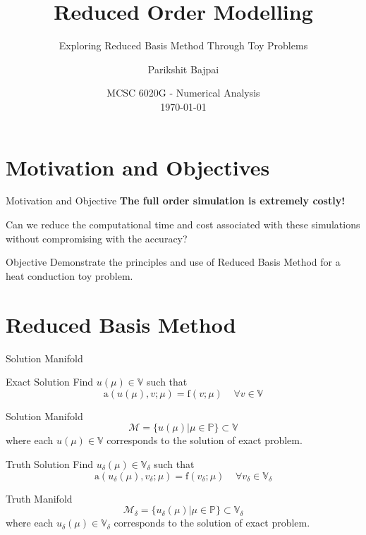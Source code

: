 \documentclass[9pt]{beamer}
\title{Reduced Order Modelling}
\subtitle{Exploring Reduced Basis Method Through Toy Problems}
\author{Parikshit Bajpai}
\date{MCSC 6020G - Numerical Analysis \\ \small{\today}}
\begin{document}
 
\frame{\titlepage}

\frame{\tableofcontents} 

\section{Motivation and Objectives}
\begin{frame}{Motivation and Objective}
\centering
\textbf{The full order simulation is extremely costly!}

Can we reduce the computational time and cost associated with these simulations without compromising with the accuracy?

\vspace{1em}
\begin{alertblock}{Objective}
    \centering Demonstrate the principles and use of Reduced Basis Method for a heat conduction toy problem.
\end{alertblock}
\end{frame}

\section{Reduced Basis Method}
\begin{frame}{Solution Manifold}
    \begin{block}{Exact Solution}
        Find $u(\mu) \in \mathbb{V}$ such that
        $$\mathrm{a}(u(\mu), v; \mu) = \mathrm{f}(v;\mu) \mspace{20mu} \forall v \in \mathbb{V}$$
    \end{block}
    \begin{block}{Solution Manifold}
        $$\mathcal{M} = \{u(\mu)|\mu \in \mathbb{P}\} \subset \mathbb{V}$$
        where each $u(\mu) \in \mathbb{V}$ corresponds to the solution of exact problem.
    \end{block}
    \begin{exampleblock}{Truth Solution}
        Find $u_{\delta}(\mu) \in \mathbb{V}_{\delta}$ such that
        $$\mathrm{a}(u_{\delta}(\mu), v_{\delta}; \mu) = \mathrm{f}(v_{\delta};\mu) \mspace{20mu} \forall v_{\delta} \in \mathbb{V}_{\delta}$$
    \end{exampleblock}
    \begin{exampleblock}{Truth Manifold}
        $$\mathcal{M}_{\delta} = \{u_{\delta}(\mu)|\mu \in \mathbb{P}\} \subset \mathbb{V}_{\delta}$$
        where each $u_{\delta}(\mu) \in \mathbb{V}_{\delta}$ corresponds to the solution of exact problem.
    \end{exampleblock}
\end{frame}
\end{document}
